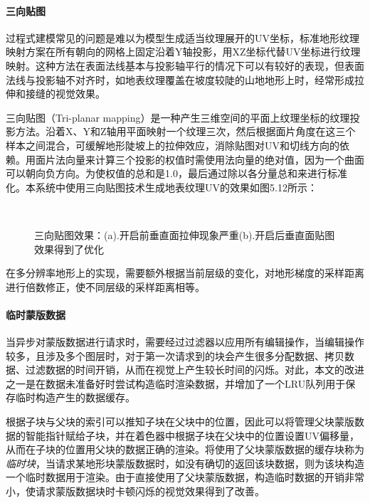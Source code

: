 \paragraph{三向贴图}
过程式建模常见的问题是难以为模型生成适当纹理展开的UV坐标，标准地形纹理映射方案在所有朝向的网格上固定沿着Y轴投影，用XZ坐标代替UV坐标进行纹理映射。这种方法在表面法线基本与投影轴平行的情况下可以有较好的表现，但表面法线与投影轴不对齐时，如地表纹理覆盖在坡度较陡的山地地形上时，经常形成拉伸和接缝的视觉效果。\par
三向贴图（Tri-planar mapping）是一种产生三维空间的平面上纹理坐标的纹理投影方法。沿着X、Y和Z轴用平面映射一个纹理三次，然后根据面片角度在这三个样本之间混合，可缓解地形陡坡上的拉伸效应，消除贴图对UV和切线方向的依赖。用面片法向量来计算三个投影的权值时需使用法向量的绝对值，因为一个曲面可以朝向负方向。为使权值的总和是1.0，最后通过除以各分量总和来进行标准化。本系统中使用三向贴图技术生成地表纹理UV的效果如图5.12所示：\par
\begin{figure}[H]
    \centering
     \\
    \caption{三向贴图效果：(a).开启前垂直面拉伸现象严重(b).开启后垂直面贴图效果得到了优化}
\end{figure}
在多分辨率地形上的实现，需要额外根据当前层级的变化，对地形梯度的采样距离进行倍数修正，使不同层级的采样距离相等。
\paragraph{临时蒙版数据}
当异步对蒙版数据进行请求时，需要经过过滤器以应用所有编辑操作，当编辑操作较多，且涉及多个图层时，对于第一次请求到的块会产生很多分配数据、拷贝数据、过滤数据的时间开销，从而在视觉上产生较长时间的闪烁。对此，本文的改进之一是在数据未准备好时尝试构造临时渲染数据，并增加了一个LRU队列用于保存临时构造产生的数据缓存。\par
根据子块与父块的索引可以推知子块在父块中的位置，因此可以将管理父块蒙版数据的智能指针赋给子块，并在着色器中根据子块在父块中的位置设置UV偏移量，从而在子块的位置用父块的数据正确的渲染。将使用了父块蒙版数据的缓存块称为\textit{临时块}，当请求某地形块蒙版数据时，如没有确切的返回该块数据，则为该块构造一个临时数据用于渲染。由于直接使用了父块蒙版数据，构造临时数据的开销非常小，使请求蒙版数据块时卡顿闪烁的视觉效果得到了改善。

